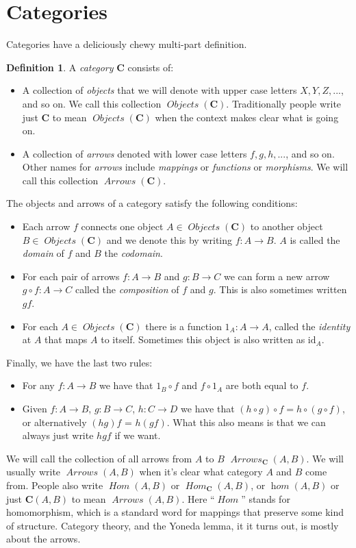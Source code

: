 \documentclass[12pt]{article}
\theoremstyle{definition}
\theoremstyle{definition}
\newtheorem{defn}{Definition}[]
\theoremstyle{definition}
\numberwithin{equation}{section}
\newcommand{\cat}[1]{\mathbf{#1}}      %
\newcommand{\id}{\mathrm{id}} %
\newcommand{\CC}{\cat{C}}
\DeclareMathOperator{\Arrows}{\mathit{Arrows}}
\DeclareMathOperator{\Objects}{\mathit{Objects}}
\DeclareMathOperator{\Hom}{\mathit{Hom}}
\DeclareMathOperator{\ihom}{\mathit{hom}}
\def\objc{\Objects(\cat{C})}
\def\ni{\goodbreak\noindent}
\begin{document}
\goodbreak
\section{Categories}

Categories have a deliciously chewy multi-part definition.

\begin{defn}
\label{category}
A {\it category} $\CC$ consists of:
%
\begin{itemize}
\item 
A collection of {\it objects} that we will denote with upper case letters $X, Y, Z, ...$,
and so on.  
We call this collection $\objc$. Traditionally people write just $\CC$ to mean $\objc$
when the context makes clear what is going on.
\item
A collection of {\it arrows} denoted with lower case letters $f, g, h, ...$, and so on.
Other names for {\it arrows} include {\it mappings} or {\it functions} or {\it morphisms}.
We will call this collection $\Arrows(\CC)$. \end{itemize}%
The objects and arrows of a category satisfy the following conditions:
\begin{itemize}
\item
Each arrow $f$ connects one object $A \in \objc$ to another object $B \in \objc$ and we denote
this by writing $f: A \to B$. $A$ is called the {\it domain} of $f$ and $B$ the {\it
codomain}.
\item
For each pair of arrows $f:A \to B$ and $g : B \to C$ we can form a new arrow $g \circ f:
A \to C$ called the {\it composition} of $f$ and $g$. This is also sometimes written $gf$.
\item
For each $A \in \objc$ there is a function $1_A: A \to A$, called the {\it identity} at
$A$ that maps $A$ to itself. Sometimes this object is also written as $\id_A$.
\end{itemize}
\goodbreak\ni Finally, we have the last two rules:

\begin{itemize}
\item For any $f: A \to B$ we have that $1_B \circ f$ and $f \circ 1_A$ are both equal to
$f$. 
\item Given $f: A \to B$, $g: B \to C$, $h: C\to D$ we have that $(h \circ g) \circ f = h
\circ (g \circ f)$, or alternatively $(hg)f$ = $h(gf)$. What this also means is that we
can always just write $hgf$ if we want. \end{itemize}%
\end{defn}%
\ni
We will call the collection of all arrows from $A$ to $B$ $\Arrows_{\CC}(A, B)$. We will
usually write $\Arrows(A,B)$ when it's clear what category $A$ and $B$ come from. People
also write $\Hom(A, B)$ or $\Hom_{\CC}(A,B)$, or $\ihom(A, B)$ or just $\CC(A,B)$ to mean
$\Arrows(A,B)$. Here ``$\Hom$'' stands for homomorphism, which is a standard word for
mappings that preserve some kind of structure. Category theory, and the Yoneda lemma, it
it turns out, is mostly about the arrows.
\end{document}
